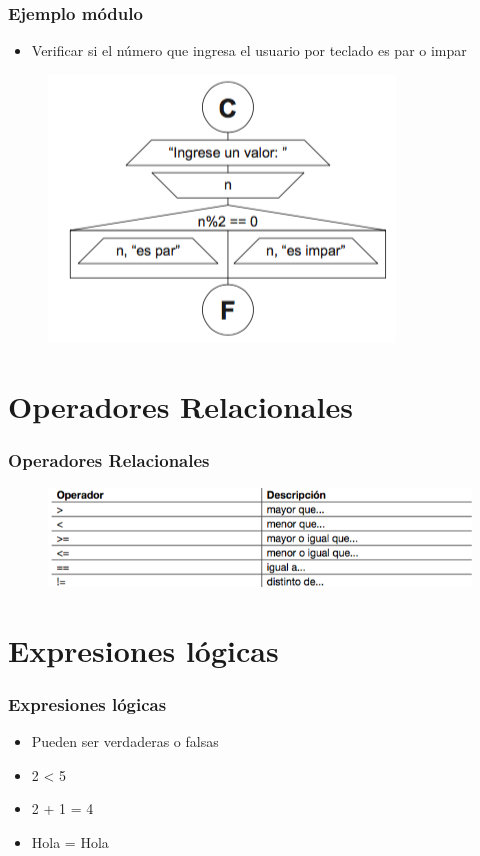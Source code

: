 \documentclass[handout]{beamer}
\begin{document}
\begin{frame}[t]\frametitle{Ejemplo módulo}
    \begin{itemize}
      \item Verificar si el número que ingresa el usuario por teclado es par o impar       
    \end{itemize}

    \begin{figure}[tb]
      \centering
      \includegraphics[scale=.7]{./img/mod}
    \end{figure}

\end{frame}

\section{Operadores Relacionales} %
\label{sec:operadores_relacionales}
\begin{frame}[t]\frametitle{Operadores Relacionales}
    
\begin{figure}[tb]
  \centering
  \includegraphics[scale=.6]{./img/oprela}
\end{figure}

\end{frame}

\section{Expresiones lógicas} %
\label{sec:exmpresiones_logicas}
\begin{frame}[t]\frametitle{Expresiones lógicas}
        
\begin{itemize}
  \item Pueden ser verdaderas o falsas
  \item 2 < 5
  \item 2 + 1 = 4
  \item Hola = Hola
\end{itemize}
\end{frame}
\end{document}
